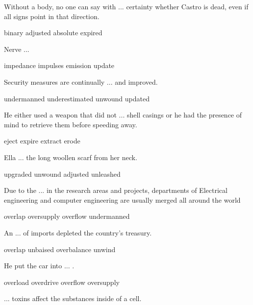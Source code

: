 \documentclass{exam}
\begin{document}
\begin{questions}
\question Without a body, no one can say with ... certainty whether Castro is dead, even if all signs point in that direction.\\
\begin{oneparchoices}
\choice binary
\choice adjusted
\correctchoice absolute
\choice expired 
\end{oneparchoices}
\question Nerve ...\\
\begin{oneparchoices}
\choice impedance 
\correctchoice impulses
\choice emission 
\choice update
\end{oneparchoices}
\question Security measures are continually ... and improved.\\
\begin{oneparchoices}
\choice undermanned
\choice underestimated
\choice unwound
\correctchoice updated
\end{oneparchoices}
\question He either used a weapon that did not ... shell casings or he had the presence of mind to retrieve them before speeding away.\\
\begin{oneparchoices}
\correctchoice eject
\choice expire
\choice extract
\choice erode
\end{oneparchoices}
\question Ella ... the long woollen scarf from her neck.\\
\begin{oneparchoices}
\choice upgraded
\correctchoice unwound
\choice adjusted
\choice unleashed
\end{oneparchoices}
\question Due to the ... in the research areas and projects, departments of Electrical engineering and computer engineering are usually merged all around the world
\\
\begin{oneparchoices}
\correctchoice overlap
\choice oversupply
\choice overflow
\choice undermanned
\end{oneparchoices}
\question An ... of imports depleted the country's treasury.\\
\begin{oneparchoices}
\choice overlap
\choice unbaised
\correctchoice overbalance
\choice unwind
\end{oneparchoices}
\question He put the car into ... .\\
\begin{oneparchoices}
\choice overload
\correctchoice overdrive
\choice overflow
\choice oversupply
\end{oneparchoices}
\question ... toxins affect the substances inside of a cell.\\

\end{questions}
\end{document}
